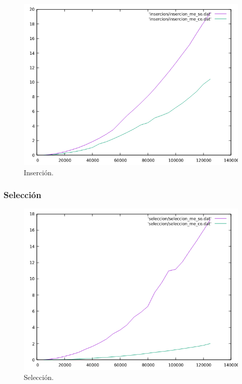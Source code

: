 \documentclass[a4paper,12pt,twoside]{article} %
\begin{document}
\begin{figure}[h]
  \begin{center}
  
  	\includegraphics[scale=0.8]{comparacion_ii.png}
  	\caption{Inserción.}
  	
  \end{center}
\end{figure}


\newpage


	\subsubsection{Selección}

\begin{figure}[h]
  \begin{center}
  
  	\includegraphics[scale=0.8]{comparacion_ss.png}
  	\caption{Selección.}
  	
  \end{center}
\end{figure}
\end{document}
